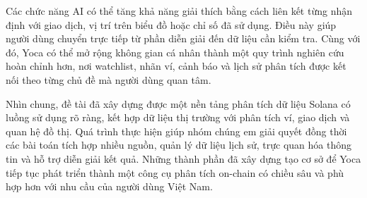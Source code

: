 Các chức năng AI có thể tăng khả năng giải thích bằng cách liên kết từng nhận định với giao dịch, vị trí trên biểu đồ hoặc chỉ số đã sử dụng. Điều này giúp người dùng chuyển trực tiếp từ phần diễn giải đến dữ liệu cần kiểm tra. Cùng với đó, Yoca có thể mở rộng không gian cá nhân thành một quy trình nghiên cứu hoàn chỉnh hơn, nơi watchlist, nhãn ví, cảnh báo và lịch sử phân tích được kết nối theo từng chủ đề mà người dùng quan tâm.

Nhìn chung, đề tài đã xây dựng được một nền tảng phân tích dữ liệu Solana có luồng sử dụng rõ ràng, kết hợp dữ liệu thị trường với phân tích ví, giao dịch và quan hệ đồ thị. Quá trình thực hiện giúp nhóm chúng em giải quyết đồng thời các bài toán tích hợp nhiều nguồn, quản lý dữ liệu lịch sử, trực quan hóa thông tin và hỗ trợ diễn giải kết quả. Những thành phần đã xây dựng tạo cơ sở để Yoca tiếp tục phát triển thành một công cụ phân tích on-chain có chiều sâu và phù hợp hơn với nhu cầu của người dùng Việt Nam.

